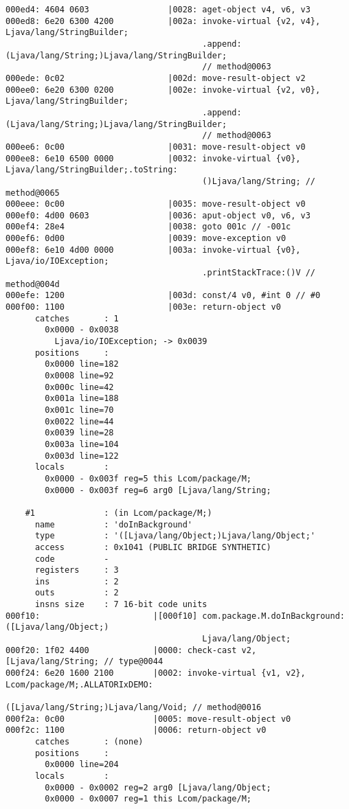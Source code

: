 \begin{lstlisting}
000ed4: 4604 0603                |0028: aget-object v4, v6, v3
000ed8: 6e20 6300 4200           |002a: invoke-virtual {v2, v4}, Ljava/lang/StringBuilder;
                                        .append:(Ljava/lang/String;)Ljava/lang/StringBuilder;
                                        // method@0063
000ede: 0c02                     |002d: move-result-object v2
000ee0: 6e20 6300 0200           |002e: invoke-virtual {v2, v0}, Ljava/lang/StringBuilder;
                                        .append:(Ljava/lang/String;)Ljava/lang/StringBuilder;
                                        // method@0063
000ee6: 0c00                     |0031: move-result-object v0
000ee8: 6e10 6500 0000           |0032: invoke-virtual {v0}, Ljava/lang/StringBuilder;.toString:
                                        ()Ljava/lang/String; // method@0065
000eee: 0c00                     |0035: move-result-object v0
000ef0: 4d00 0603                |0036: aput-object v0, v6, v3
000ef4: 28e4                     |0038: goto 001c // -001c
000ef6: 0d00                     |0039: move-exception v0
000ef8: 6e10 4d00 0000           |003a: invoke-virtual {v0}, Ljava/io/IOException;
                                        .printStackTrace:()V // method@004d
000efe: 1200                     |003d: const/4 v0, #int 0 // #0
000f00: 1100                     |003e: return-object v0
      catches       : 1
        0x0000 - 0x0038
          Ljava/io/IOException; -> 0x0039
      positions     :
        0x0000 line=182
        0x0008 line=92
        0x000c line=42
        0x001a line=188
        0x001c line=70
        0x0022 line=44
        0x0039 line=28
        0x003a line=104
        0x003d line=122
      locals        :
        0x0000 - 0x003f reg=5 this Lcom/package/M;
        0x0000 - 0x003f reg=6 arg0 [Ljava/lang/String;

    #1              : (in Lcom/package/M;)
      name          : 'doInBackground'
      type          : '([Ljava/lang/Object;)Ljava/lang/Object;'
      access        : 0x1041 (PUBLIC BRIDGE SYNTHETIC)
      code          -
      registers     : 3
      ins           : 2
      outs          : 2
      insns size    : 7 16-bit code units
000f10:                       |[000f10] com.package.M.doInBackground:([Ljava/lang/Object;)
                                        Ljava/lang/Object;
000f20: 1f02 4400             |0000: check-cast v2, [Ljava/lang/String; // type@0044
000f24: 6e20 1600 2100        |0002: invoke-virtual {v1, v2}, Lcom/package/M;.ALLATORIxDEMO:
                                     ([Ljava/lang/String;)Ljava/lang/Void; // method@0016
000f2a: 0c00                  |0005: move-result-object v0
000f2c: 1100                  |0006: return-object v0
      catches       : (none)
      positions     :
        0x0000 line=204
      locals        :
        0x0000 - 0x0002 reg=2 arg0 [Ljava/lang/Object;
        0x0000 - 0x0007 reg=1 this Lcom/package/M;


\end{lstlisting}
